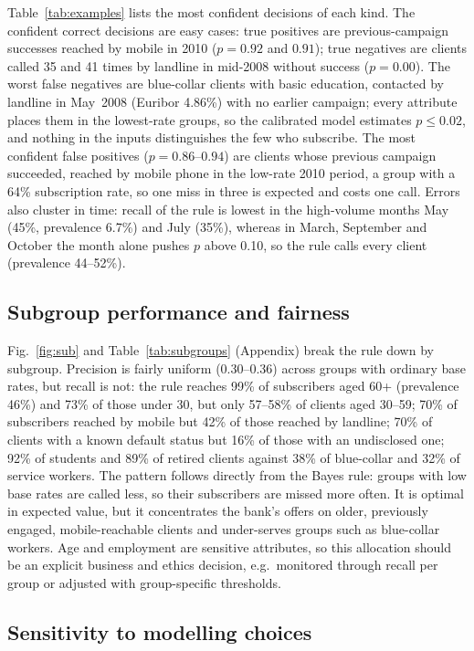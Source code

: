 \documentclass[conference]{IEEEtran}
\begin{document}
Table~\ref{tab:examples} lists the most confident decisions of each kind. The confident correct decisions are easy cases: true positives are previous-campaign successes reached by mobile in 2010 ($p=0.92$ and $0.91$); true negatives are clients called 35 and 41 times by landline in mid-2008 without success ($p=0.00$). The worst false negatives are blue-collar clients with basic education, contacted by landline in May~2008 (Euribor 4.86\%) with no earlier campaign; every attribute places them in the lowest-rate groups, so the calibrated model estimates $p\le0.02$, and nothing in the inputs distinguishes the few who subscribe. The most confident false positives ($p=0.86$--$0.94$) are clients whose previous campaign succeeded, reached by mobile phone in the low-rate 2010 period, a group with a 64\% subscription rate, so one miss in three is expected and costs one call. Errors also cluster in time: recall of the rule is lowest in the high-volume months May (45\%, prevalence 6.7\%) and July (35\%), whereas in March, September and October the month alone pushes $p$ above 0.10, so the rule calls every client (prevalence 44--52\%).

\subsection{Subgroup performance and fairness}
Fig.~\ref{fig:sub} and Table~\ref{tab:subgroups} (Appendix) break the rule down by subgroup. Precision is fairly uniform (0.30--0.36) across groups with ordinary base rates, but recall is not: the rule reaches 99\% of subscribers aged 60+ (prevalence 46\%) and 73\% of those under 30, but only 57--58\% of clients aged 30--59; 70\% of subscribers reached by mobile but 42\% of those reached by landline; 70\% of clients with a known default status but 16\% of those with an undisclosed one; 92\% of students and 89\% of retired clients against 38\% of blue-collar and 32\% of service workers. The pattern follows directly from the Bayes rule: groups with low base rates are called less, so their subscribers are missed more often. It is optimal in expected value, but it concentrates the bank's offers on older, previously engaged, mobile-reachable clients and under-serves groups such as blue-collar workers. Age and employment are sensitive attributes, so this allocation should be an explicit business and ethics decision, e.g.\ monitored through recall per group or adjusted with group-specific thresholds.

\subsection{Sensitivity to modelling choices}\label{sec:sensitivity}
\begin{table}[t]
\caption{Effect of three modelling choices on the test set (random split unless stated). Rows with \texttt{duration} are unrealistic (leakage); the temporal split trains on the first 80\% of clients in time and tests on the last 20\%.}
\label{tab:sens}
\centering\scriptsize
\setlength{\tabcolsep}{3pt}
\resizebox{\columnwidth}{!}{}
\end{table}
\end{document}
